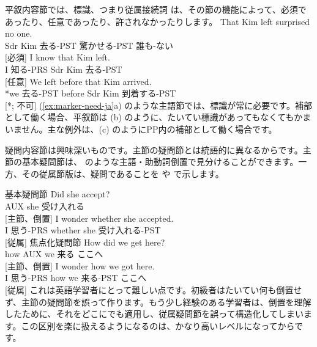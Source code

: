 平叙内容節では、標識、つまり従属接続詞  は、その節の機能によって、必須であったり、任意であったり、許されなかったりします。
\ea\label{ex:marker-need-ja}
    \ea \gll That Kim left surprised no one.\\
        Sdr Kim 去る-PST 驚かせる-PST 誰も-ない\\
    \glt {} [必須]
    \ex \gll I know that Kim left.\\
        I 知る-PRS Sdr Kim 去る-PST\\
    \glt {} [任意]
    \ex \gll *We left before that Kim arrived.\\
        *we 去る-PST before Sdr Kim 到着する-PST\\
    \glt {} [*; 不可]
\z
\z
(\ref{ex:marker-need-ja}a) のような主語節では、標識が常に必要です。補部として働く場合、平叙節は (b) のように、たいてい標識があってもなくてもかまいません。主な例外は、(c) のようにPP内の補部として働く場合です。

\label{sec:sub-interrog-ja}

疑問内容節は興味深いものです。主節の疑問節とは統語的に異なるからです。主節の基本疑問節は、 のような主語・助動詞倒置で見分けることができます。一方、その従属節版は、疑問であることを  や  で示します。

\ea 基本疑問節\label{ex:int-sub-ja}
    \ea \gll Did she accept?\\
        AUX she 受け入れる\\
    \glt {} [主節、倒置]
    \ex \gll I wonder {\ob}whether she accepted{\cb}.\\
        I 思う-PRS whether she 受け入れる-PST\\
    \glt {} [従属]
    \z
\z
\ea 焦点化疑問節
    \ea \gll How did we get here?\\
        how AUX we 来る ここへ\\
    \glt {} [主節、倒置]
    \ex \gll I wonder {\ob}how we got here{\cb}.\\
        I 思う-PRS how we 来る-PST ここへ\\
    \glt {} [従属]
    \z
\z
これは英語学習者にとって難しい点です。初級者はたいてい何も倒置せず、主節の疑問節を誤って作ります。もう少し経験のある学習者は、倒置を理解したために、それをどこにでも適用し、従属疑問節を誤って構造化してしまいます。この区別を楽に扱えるようになるのは、かなり高いレベルになってからです。

